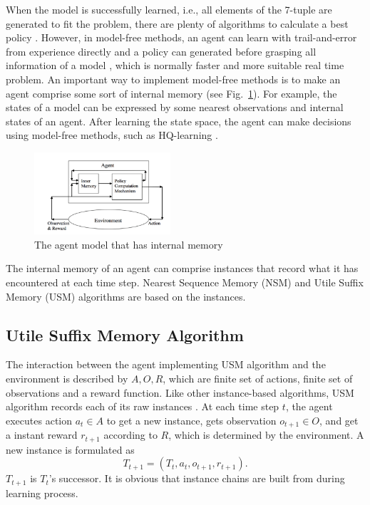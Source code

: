 \documentclass[conference]{IEEEtran}
\begin{document}
	When the model is successfully learned, i.e., all elements of the 7-tuple are
	generated to fit the problem, there are plenty of algorithms to calculate a best
	policy \cite{shani2013survey}. However, in model-free methods, an agent can learn
	with trail-and-error from experience directly and a policy can generated before
	grasping all information of a model \cite{li2017deep}, which is normally faster
	and more suitable real time problem.  An important way to implement model-free
	methods is to make an agent comprise some sort of internal memory \cite{aberdeen2003policy,
		meuleau1999learning, mccallum1995instance} (see Fig.~\ref{fig:agent memory}).
	For example, the states of a model can be expressed by some nearest observations
	and internal states of an agent. After learning the state space, the agent can make
	decisions using model-free methods, such as HQ-learning \cite{wiering1997hq}.
	
	\begin{figure}[b]
		\centering
		\includegraphics[width=0.45\textwidth]{agent_with_memory.png}
		\caption{The agent model that has internal memory}
		\label{fig:agent memory}
	\end{figure}
	
	The internal memory of an agent can comprise instances that record what it has
	encountered at each time step. Nearest Sequence Memory (NSM) and Utile
	Suffix Memory (USM) algorithms are based on the instances.
	
	
	\subsection{Utile Suffix Memory Algorithm}
	
	The interaction between the agent implementing USM algorithm and the environment is described by
	$A, O, R$, which are finite set of actions, finite set of observations and a reward function.
	Like other instance-based algorithms, USM algorithm records each of its raw instances
	\cite{mccallum1995instance}. At each time step $t$, the agent executes action
	$a_t \in A$ to get a new instance, gets observation $o_{t+1} \in O$, and get a
	instant reward $r_{t+1}$ according to $R$, which is determined by the environment.
	A new instance is formulated as
	\begin{equation}
	T_{t+1}= (T_t, a_t, o_{t+1}, r_{t+1}). \label{equ:instance}
	\end{equation}
	$T_{t+1}$ is $T_t$'s successor. It is obvious that instance chains are built
	from during learning process.
	
\end{document}
